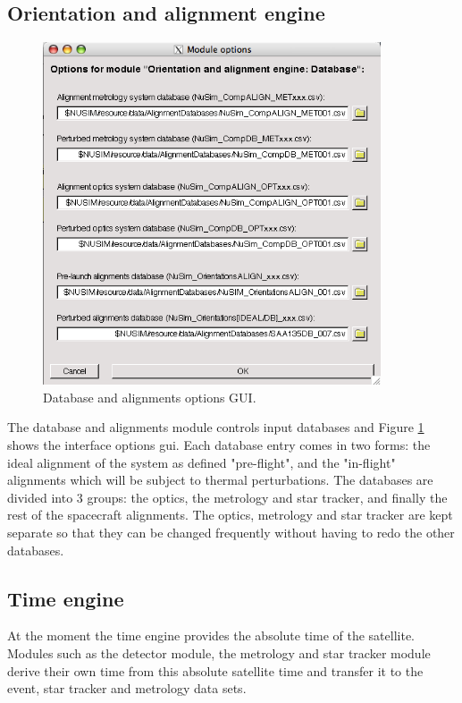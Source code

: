 \subsection{Orientation and alignment engine}
\begin{figure}[tb]
\begin{center}
\includegraphics[width=10cm]{images/DBgui.png}  
\caption{Database and alignments options GUI.}
\label{dbgui} 
\end{center}
\end{figure}

The database and alignments module controls input databases and Figure \ref{dbgui} shows the interface options gui. Each database entry comes in two forms: the ideal alignment of the system as defined "pre-flight", and the "in-flight" alignments which will be subject to thermal perturbations. The databases are divided into 3 groups: the optics, the metrology and star tracker, and finally the rest of the spacecraft alignments. The optics, metrology and star tracker are kept separate so that they can be changed frequently without having to redo the other databases.

\subsection{Time engine}
At the moment the time engine provides the absolute time of the satellite. Modules such as the detector module, the metrology and star tracker module derive their own time from this absolute satellite time and transfer it to the event, star tracker and metrology data sets.   

